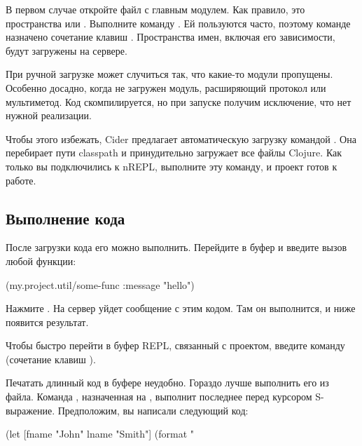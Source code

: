 В первом случае откройте файл с главным модулем. Как правило, это пространства  или . Выполните команду . Ей пользуются часто, поэтому команде назначено сочетание клавиш . Пространства имен, включая его зависимости, будут загружены на сервере.

При ручной загрузке может случиться так, что какие-то модули пропущены. Особенно досадно, когда не загружен модуль, расширяющий протокол или мультиметод. Код скомпилируется, но при запуске получим исключение, что нет нужной реализации.

Чтобы этого избежать, Cider предлагает автоматическую загрузку командой . Она перебирает пути classpath и принудительно загружает все файлы Clojure. Как только вы подключились к nREPL, выполните эту команду, и проект готов к работе.

\subsection{Выполнение кода}

После загрузки кода его можно выполнить. Перейдите в буфер  и введите вызов любой функции:

\begin{english}
  \begin{clojure}
(my.project.util/some-func {:message "hello"})
  \end{clojure}
\end{english}

Нажмите \enter. На сервер уйдет сообщение с этим кодом. Там он выполнится, и ниже появится результат.

Чтобы быстро перейти в буфер REPL, связанный с проектом, введите команду  (сочетание клавиш ).

Печатать длинный код в буфере  неудобно. Гораздо лучше выполнить его из файла. Команда , назначенная на , выполнит последнее перед курсором S-выражение. Предположим, вы написали следующий код:

\begin{english}
  \begin{clojure}
(let [fname "John"
      lname "Smith"]
  (format "%
  \end{clojure}
\end{english}

